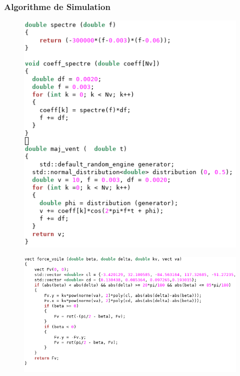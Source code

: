 \documentclass{beamer}
\begin{document}
\begin{frame}[plain]\frametitle{Algorithme de Simulation}
\begin{figure}
\includegraphics[scale=0.35]{sim1.png} 
\end{figure}
\end{frame}

\begin{frame}[plain]
\begin{figure}
\includegraphics[scale=0.35]{sim2.png} 
\end{figure}
\end{frame}
\end{document}
